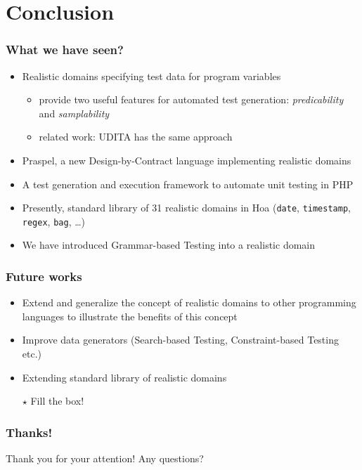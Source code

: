 \documentclass[10pt]{beamer}
\newcommand{\code}[1]{\texttt{#1}}
\newcommand{\outlinereminder}[0]{
  \frame{\frametitle{Outline}
  \tableofcontents[currentsection,subsectionstyle=show/show/hide]}
}
\begin{document}
\section{Conclusion}

\outlinereminder

\begin{frame}
\frametitle{What we have seen?}

\begin{itemize}
\item Realistic domains specifying test data for program variables
  \begin{itemize}
  \item provide two useful features for automated test generation: {\em
  predicability} and {\em samplability}
  \item related work: UDITA has the same approach
  \end{itemize}
\item Praspel, a new Design-by-Contract language implementing realistic domains
\item A test generation and execution framework to automate unit testing in PHP
\item Presently, standard library of 31 realistic domains in Hoa (\code{date},
\code{timestamp}, \code{regex}, \code{bag}, …)
\item We have introduced Grammar-based Testing into a realistic domain
\end{itemize}

\end{frame}

\begin{frame}
\frametitle{Future works}

\begin{itemize}
\item Extend and generalize the concept of realistic domains to other
programming languages to illustrate the benefits of this concept
\item Improve data generators (Search-based Testing, Constraint-based Testing
etc.)
\item Extending standard library of realistic domains
\item[$\star$] Fill the box!
\end{itemize}

\end{frame}

\begin{frame}
\frametitle{Thanks!}

\begin{center}
Thank you for your attention! Any questions?
\end{center}

\end{frame}
\end{document}
